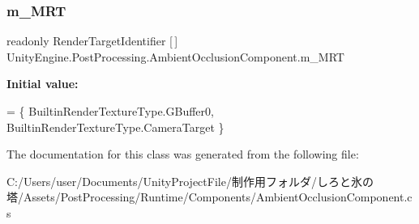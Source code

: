 \subsubsection{\texorpdfstring{m\+\_\+\+M\+RT}{m\_MRT}}
{\footnotesize\ttfamily readonly Render\+Target\+Identifier \mbox{[}$\,$\mbox{]} Unity\+Engine.\+Post\+Processing.\+Ambient\+Occlusion\+Component.\+m\+\_\+\+M\+RT\hspace{0.3cm}{\ttfamily [private]}}

{\bfseries Initial value\+:}
\begin{DoxyCode}
=
        \{
            BuiltinRenderTextureType.GBuffer0, 
            BuiltinRenderTextureType.CameraTarget 
        \}
\end{DoxyCode}


The documentation for this class was generated from the following file\+:\begin{DoxyCompactItemize}
\item 
C\+:/\+Users/user/\+Documents/\+Unity\+Project\+File/制作用フォルダ/しろと氷の塔/\+Assets/\+Post\+Processing/\+Runtime/\+Components/Ambient\+Occlusion\+Component.\+cs\end{DoxyCompactItemize}
